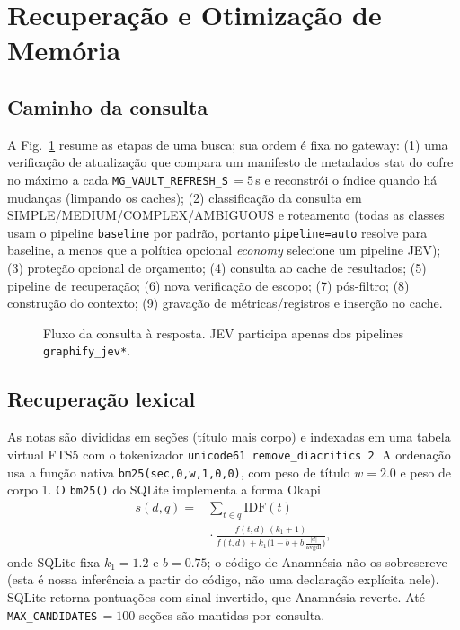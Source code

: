 \documentclass[conference,onecolumn,11pt]{IEEEtran}
\newcommand{\anam}{Anam\-n\'esia}
\begin{document}
\section{Recuperação e Otimização de Memória}\label{sec:retrieval}
\subsection{Caminho da consulta}
A Fig.~\ref{fig:flow} resume as etapas de uma busca; sua ordem é fixa no gateway: (1) uma verificação de atualização que compara um manifesto de metadados stat do cofre no máximo a cada \texttt{MG\_VAULT\_REFRESH\_S}\,$=5$\,s e reconstrói o índice quando há mudanças (limpando os caches); (2) classificação da consulta em SIMPLE/MEDIUM/COMPLEX/AMBIGUOUS e roteamento (todas as classes usam o pipeline \texttt{baseline} por padrão, portanto \texttt{pipeline=auto} resolve para baseline, a menos que a política opcional \emph{economy} selecione um pipeline JEV); (3) proteção opcional de orçamento; (4) consulta ao cache de resultados; (5) pipeline de recuperação; (6) nova verificação de escopo; (7) pós-filtro; (8) construção do contexto; (9) gravação de métricas/registros e inserção no cache.

\begin{figure}[!htbp]\centering
{}
\caption{Fluxo da consulta à resposta. JEV participa apenas dos pipelines \texttt{graphify\_jev*}.}\label{fig:flow}
\end{figure}

\subsection{Recuperação lexical}
As notas são divididas em seções (título mais corpo) e indexadas em uma tabela virtual FTS5 com o tokenizador \texttt{unicode61 remove\_diacritics 2}. A ordenação usa a função nativa \texttt{bm25(sec,0,w,1,0,0)}, com peso de título $w=2.0$ e peso de corpo 1. O \texttt{bm25()} do SQLite implementa a forma Okapi \cite{sqlitefts5,robertson2009bm25}
\begin{equation}
\begin{aligned}
s(d,q)={}&\sum_{t\in q}\mathrm{IDF}(t)\\
&{}\cdot\frac{f(t,d)\,(k_1+1)}{f(t,d)+k_1\bigl(1-b+b\,\tfrac{|d|}{\mathrm{avgdl}}\bigr)},
\end{aligned}\label{eq:bm25}
\end{equation}
onde SQLite fixa $k_1{=}1.2$ e $b{=}0.75$; o código de \anam{} não os sobrescreve (esta é nossa inferência a partir do código, não uma declaração explícita nele). SQLite retorna pontuações com sinal invertido, que \anam{} reverte. Até \texttt{MAX\_CANDIDATES}\,$=100$ seções são mantidas por consulta.
\end{document}
